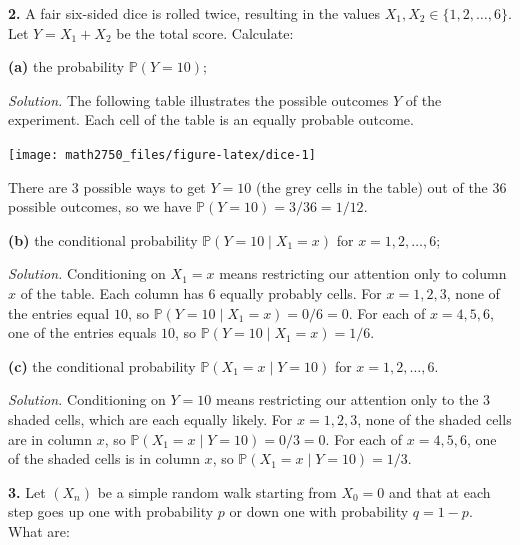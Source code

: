\documentclass[
  a4paper,
]{article}
\theoremstyle{definition}
\theoremstyle{definition}
\theoremstyle{definition}
\theoremstyle{remark}
\begin{document}
\textbf{2.} A fair six-sided dice is rolled twice, resulting in the
values \(X_1, X_2 \in \{1, 2, \ldots, 6\}\). Let \(Y = X_1 + X_2\) be the total score.
Calculate:

\textbf{(a)} the probability \(\mathbb P(Y = 10)\);

\begin{myanswers}
\emph{Solution.} The following table illustrates the possible outcomes \(Y\) of the experiment. Each cell of the table is an equally probable outcome.

\begin{center}\texttt{[image: math2750\_files/figure-latex/dice-1]} \end{center}

There are 3 possible ways to get \(Y=10\) (the grey cells in the table) out of the \(36\) possible outcomes, so we have \(\mathbb P(Y = 10) = 3/36 = 1/12\).

\end{myanswers}

\textbf{(b)} the conditional probability \(\mathbb P(Y=10 \mid X_1=x)\) for \(x=1, 2, \ldots, 6\);

\begin{myanswers}
\emph{Solution.} Conditioning on \(X_1 = x\) means restricting our attention only to column \(x\) of the table. Each column has \(6\) equally probably cells. For \(x=1,2,3\), none of the entries equal \(10\), so \(\mathbb P(Y=10 \mid X_1=x) = 0/6 = 0\). For each of \(x=4,5,6\), one of the entries equals \(10\), so \(\mathbb P(Y=10 \mid X_1=x) = 1/6\).

\end{myanswers}

\textbf{(c)} the conditional probability \(\mathbb P(X_1=x \mid Y=10)\) for \(x=1, 2, \ldots, 6\).

\begin{myanswers}
\emph{Solution.} Conditioning on \(Y =10\) means restricting our attention only to the \(3\) shaded cells, which are each equally likely. For \(x=1,2,3\), none of the shaded cells are in column \(x\), so \(\mathbb P(X_1=x \mid Y=10) = 0/3 = 0\). For each of \(x=4,5,6\), one of the shaded cells is in column \(x\), so \(\mathbb P(X_1=x \mid Y=10) = 1/3\).

\end{myanswers}

\textbf{3.} Let \((X_n)\) be a simple random walk starting from \(X_0 = 0\) and that at each step goes up one with probability \(p\) or down one with probability \(q = 1-p\). What are:
\end{document}
